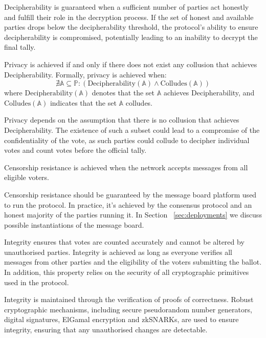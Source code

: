 \documentclass[runningheads]{llncs}
\begin{document}
Decipherability is guaranteed when a sufficient number of parties act honestly and fulfill their role in the decryption process. If the set of honest and available parties drops below the decipherability threshold, the protocol's ability to ensure decipherability is compromised, potentially leading to an inability to decrypt the final tally.

\begin{definition}[Privacy] \label{def:privacy}
    Privacy is achieved if and only if there does not exist any collusion that achieves Decipherability. Formally, privacy is achieved when:
    \[
    \nexists \mathbb{A} \subseteq \mathbb{P} : (\text{Decipherability}(\mathbb{A}) \land \text{Colludes}(\mathbb{A}))
    \]
    where \( \text{Decipherability}(\mathbb{A}) \) denotes that the set \( \mathbb{A} \) achieves Decipherability, and \( \text{Colludes}(\mathbb{A}) \) indicates that the set \( \mathbb{A} \) colludes.
\end{definition}

Privacy depends on the assumption that there is no collusion that achieves Decipherability. The existence of such a subset could lead to a compromise of the confidentiality of the vote, as such parties could collude to decipher individual votes and count votes before the official tally.

\begin{definition}
    Censorship resistance is achieved when the network accepts messages from all eligible voters.
\end{definition}

Censorship resistance should be guaranteed by the message board platform used to run the protocol. In practice, it's achieved by the consensus protocol and an honest majority of the parties running it. In Section ~\ref{sec:deployments} we discuss possible instantiations of the message board.

\begin{definition}[Integrity]
    Integrity ensures that votes are counted accurately and cannot be altered by unauthorised parties. Integrity is achieved as long as everyone verifies all messages from other parties and the eligibility of the voters submitting the ballot. In addition, this property relies on the security of all cryptographic primitives used in the protocol.
\end{definition}

Integrity is maintained through the verification of proofs of correctness. Robust cryptographic mechanisms, including secure pseudorandom number generators, digital signatures, ElGamal encryption and zkSNARKs, are used to ensure integrity, ensuring that any unauthorised changes are detectable.
\end{document}
